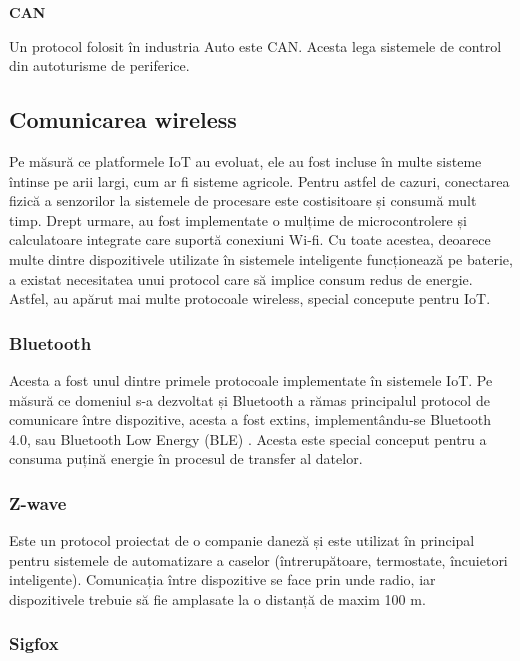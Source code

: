 \textbf{CAN}

Un protocol folosit în industria Auto este CAN. Acesta lega sistemele de control
din autoturisme de periferice.

\subsection{Comunicarea wireless}
\label{sec:embed-bus-wireless}

Pe măsură ce platformele IoT au evoluat, ele au fost incluse în multe sisteme
întinse pe arii largi, cum ar fi sisteme agricole. Pentru astfel de cazuri,
conectarea fizică a senzorilor la sistemele de procesare este costisitoare și
consumă mult timp. Drept urmare, au fost implementate o mulțime de
microcontrolere și calculatoare integrate care suportă conexiuni Wi-fi. Cu toate
acestea, deoarece multe dintre dispozitivele utilizate în sistemele inteligente
funcționează pe baterie, a existat necesitatea unui protocol care să implice
consum redus de energie. Astfel, au apărut mai multe protocoale wireless,
special concepute pentru IoT.

\subsubsection{Bluetooth}
\label{sec:embed-bus-wireless-bluetooth}

Acesta a fost unul dintre primele protocoale implementate în sistemele IoT. Pe
măsură ce domeniul s-a dezvoltat și Bluetooth a rămas principalul protocol de
comunicare între dispozitive, acesta a fost extins, implementându-se Bluetooth
4.0, sau Bluetooth Low Energy (BLE) . Acesta
este special conceput pentru a consuma puțină energie în procesul de transfer al
datelor.


\subsubsection{Z-wave}
\label{sec:embed-bus-wireless-zwave}

Este un protocol proiectat de o companie daneză și este utilizat în principal
pentru sistemele de automatizare a caselor (întrerupătoare, termostate,
încuietori inteligente). Comunicația între dispozitive se face prin unde radio,
iar dispozitivele trebuie să fie amplasate la o distanță de maxim 100 m.

\subsubsection{Sigfox}
\label{sec:embed-bus-wireless-sigfox}

